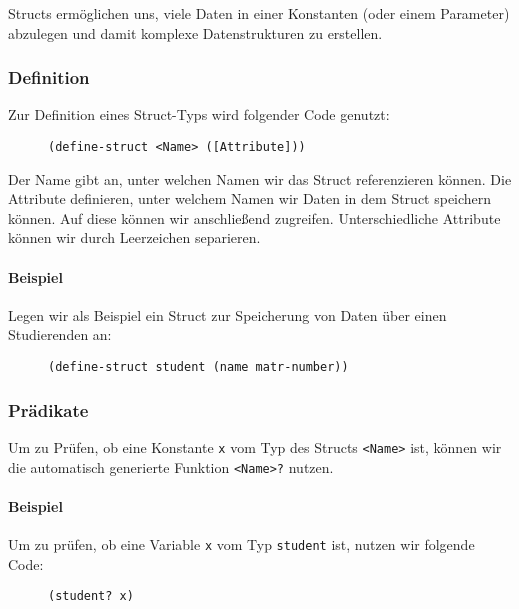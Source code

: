 	Structs ermöglichen uns, viele Daten in einer Konstanten (oder einem Parameter) abzulegen und damit komplexe Datenstrukturen zu erstellen.
	
	\subsubsection{Definition}
		Zur Definition eines Struct-Typs wird folgender Code genutzt:
		\begin{figure}[H]
			\centering
			\lstinline[language = Racket]|(define-struct <Name> ([Attribute]))|
		\end{figure}
		Der Name gibt an, unter welchen Namen wir das Struct referenzieren können. Die Attribute definieren, unter welchem Namen wir Daten in dem Struct speichern können. Auf diese können wir anschließend zugreifen. Unterschiedliche Attribute können wir durch Leerzeichen separieren.
		
		\paragraph{Beispiel}
			Legen wir als Beispiel ein Struct zur Speicherung von Daten über einen Studierenden an:
			\begin{figure}[H]
				\centering
				\begin{lstlisting}[language = Racket]
(define-struct student (name matr-number))
\end{lstlisting}
			\end{figure}
	
	\subsubsection{Prädikate}
		Um zu Prüfen, ob eine Konstante \texttt{x} vom Typ des Structs \texttt{<Name>} ist, können wir die automatisch generierte Funktion \texttt{<Name>?} nutzen.
		
		\paragraph{Beispiel}
			Um zu prüfen, ob eine Variable \texttt{x} vom Typ \texttt{student} ist, nutzen wir folgende Code:
			\begin{figure}[H]
				\centering
				\begin{lstlisting}[language = Racket]
(student? x)
\end{lstlisting}
			\end{figure}
	
